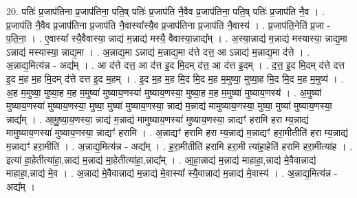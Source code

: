 \documentclass[17pt]{extarticle}
\begin{document}
20. पतिः॑ प्र॒जाप॑तिना प्र॒जाप॑तिना॒ पति॒ष् पतिः॑ प्र॒जाप॑ति नै॒वैव प्र॒जाप॑तिना॒ पति॒ष् पतिः॑ प्र॒जाप॑ति नै॒व । . प्र॒जाप॑ति नै॒वैव प्र॒जाप॑तिना प्र॒जाप॑ति नै॒वास्या᳚स्यै॒व प्र॒जाप॑तिना प्र॒जाप॑ति नै॒वास्य॑ । . प्र॒जाप॑ति॒नेति॑ प्र॒जा - प॒ति॒ना॒ । . ए॒वास्या᳚ स्यै॒वैवास्या॒ न्नाद्य॑ म॒न्नाद्य॑ मस्यै॒ वैवास्या॒न्नाद्य᳚म् । . अ॒स्या॒न्नाद्य॑ म॒न्नाद्य॑ मस्यास्या॒ न्नाद्य॒मा ऽन्नाद्य॑ मस्यास्या॒ न्नाद्य॒मा । . अ॒न्नाद्य॒मा ऽन्नाद्य॑ म॒न्नाद्य॒मा द॑त्ते दत्त॒ आ ऽन्नाद्य॑ म॒न्नाद्य॒मा द॑त्ते । . अ॒न्नाद्य॒मित्य॑न्न - अद्य᳚म् । . आ द॑त्ते दत्त॒ आ द॑त्त इ॒द मि॒दम् द॑त्त॒ आ द॑त्त इ॒दम् । . द॒त्त॒ इ॒द मि॒दम् द॑त्ते दत्त इ॒द म॒ह म॒ह मि॒दम् द॑त्ते दत्त इ॒द म॒हम् । . इ॒द म॒ह म॒ह मि॒द मि॒द म॒ह म॒मुष्या॒ मुष्या॒ह मि॒द मि॒द म॒ह म॒मुष्य॑ । . अ॒ह म॒मुष्या॒ मुष्या॒ह म॒ह म॒मुष्या॑ मुष्याय॒णस्या॑ मुष्याय॒णस्या॒ मुष्या॒ह म॒ह म॒मुष्या॑ मुष्याय॒णस्य॑ । . अ॒मुष्या॑ मुष्याय॒णस्या॑ मुष्याय॒णस्या॒ मुष्या॒ मुष्या॑ मुष्याय॒णस्या॒ न्नाद्य॑ म॒न्नाद्य॑ मामुष्याय॒णस्या॒ मुष्या॒ मुष्या॑ मुष्याय॒णस्या॒ न्नाद्य᳚म् । . आ॒मु॒ष्या॒य॒णस्या॒ न्नाद्य॑ म॒न्नाद्य॑ मामुष्याय॒णस्या॑ मुष्याय॒णस्या॒ न्नाद्यꣳ॑ हरामि हरा
म्य॒न्नाद्य॑ मामुष्याय॒णस्या॑ मुष्याय॒णस्या॒ न्नाद्यꣳ॑ हरामि । . अ॒न्नाद्यꣳ॑ हरामि हरा म्य॒न्नाद्य॑ म॒न्नाद्यꣳ॑ हरा॒मीतीति॑ हरा म्य॒न्नाद्य॑ म॒न्नाद्यꣳ॑ हरा॒मीति॑ । . अ॒न्नाद्य॒मित्य॑न्न - अद्य᳚म् । . ह॒रा॒मीतीति॑ हरामि हरा॒मी त्या॑हा॒हेति॑ हरामि हरा॒मीत्या॑ह । . इत्या॑ हा॒हेतीत्या॑हा॒,न्नाद्य॑ म॒न्नाद्य॑ मा॒हेतीत्या॑हा॒,न्नाद्य᳚म् । . आ॒हा॒न्नाद्य॑ म॒न्नाद्य॑ माहाहा॒,न्नाद्य॑ मे॒वैवान्नाद्य॑ माहाहा॒,न्नाद्य॑ मे॒व । . अ॒न्नाद्य॑ मे॒वैवान्नाद्य॑ म॒न्नाद्य॑ मे॒वास्या᳚ स्यै॒वान्नाद्य॑ म॒न्नाद्य॑ मे॒वास्य॑ । . अ॒न्नाद्य॒मित्य॑न्न - अद्य᳚म् । \newline
\end{document}
